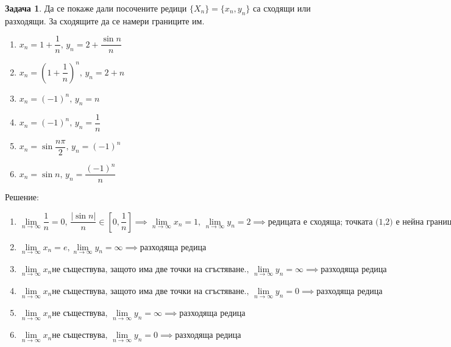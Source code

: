 \documentclass[a4paper,fleqn,12pt]{article}
\theoremstyle{definition}
\newtheorem{task}{Задача}[subsection]
\begin{document}
\begin{task}
Да се покаже дали посочените редици $\{ X_n \} = \{ x_n, y_n \}$ са сходящи или разходящи. За сходящите да се намери границите им.\\
\begin{enumerate}

\item $x_n = 1 + \dfrac{1}{n}, \, y_n = 2 + \dfrac{\sin{n}}{n}$
\item $x_n = \left( 1 + \dfrac{1}{n} \right) ^n, \, y_n = 2 + n $
\item $x_n = (-1)^n, \, y_n = n$
\item $x_n = (-1)^n, \, y_n = \dfrac{1}{n}$
\item $x_n =\sin{\dfrac{n \pi }{2}}, \, y_n = (-1)^n$
\item $x_n = \sin{n}, \, y_n = \dfrac{(-1)^n}{n}$

\end{enumerate}
Решение: \\
\begin{enumerate}

\item $\lim\limits_{n \to \infty} \dfrac{1}{n} = 0, \, \dfrac{\vert \sin{n} \vert}{n} \in \left[0, \dfrac{1}{n} \right] \implies 
\lim\limits_{n \to \infty} x_n = 1, \, \lim\limits_{n \to \infty} y_n = 2 \implies 
\text{редицата е сходяща; точката (1,2) е нейна граница}$

\item $ \lim\limits_{n \to \infty} x_n = e , \lim\limits_{n \to \infty} y_n = \infty \implies 
\text{разходяща редица} $

\item $ \lim\limits_{n \to \infty} x_n \text{не съществува, защото има две точки на сгъстяване.}, \,  
\lim\limits_{n \to \infty} y_n = \infty \implies \text{разходяща редица}$

\item $\lim\limits_{n \to \infty} x_n \text{не съществува, защото има две точки на сгъстяване.}, \,  
\lim\limits_{n \to \infty} y_n = 0 \implies \text{разходяща редица}$

\item $\lim\limits_{n \to \infty} x_n \text{не съществува}, \,  
\lim\limits_{n \to \infty} y_n = \infty \implies \text{разходяща редица}$

\item $\lim\limits_{n \to \infty} x_n \text{не съществува}, \,  
\lim\limits_{n \to \infty} y_n = 0 \implies \text{разходяща редица}$

\end{enumerate}

\end{task}
\end{document}
